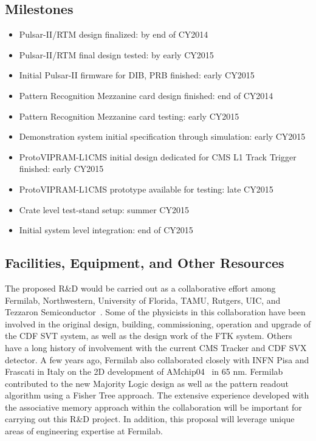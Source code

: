 \subsection{Milestones}
\begin{itemize}

\item Pulsar-II/RTM design finalized: by end of CY2014
\item Pulsar-II/RTM final design tested: by early CY2015
\item Initial Pulsar-II firmware for DIB, PRB finished: early CY2015
\item Pattern Recognition Mezzanine card design finished:  end of CY2014
\item Pattern Recognition Mezzanine card testing:  early CY2015
\item Demonstration system initial specification through simulation:  early CY2015
\item ProtoVIPRAM-L1CMS initial design dedicated for CMS L1 Track Trigger finished: early CY2015
\item ProtoVIPRAM-L1CMS prototype available for testing:  late CY2015
\item Crate level test-stand setup: summer CY2015
\item Initial system level integration: end of CY2015

\end{itemize}

\subsection{Facilities, Equipment, and Other Resources}

The proposed R\&D would be carried out as a collaborative effort among Fermilab, Northwestern, University of Florida, TAMU, Rutgers, UIC, and Tezzaron Semiconductor~\cite{bib:Tezzaron}. Some of the physicists in this collaboration have been involved in the original design, building, commissioning, operation and upgrade of the CDF SVT system, as well as the design work of the FTK system. Others have a long history of involvement with the current CMS Tracker and CDF SVX detector. A few years ago, Fermilab also collaborated closely with INFN Pisa and Frascati in Italy on the 2D development of AMchip04~\cite{bib:AMchip04} in 65 nm.  Fermilab contributed to the new Majority Logic design as well as the pattern readout algorithm using a Fisher Tree approach. The extensive experience developed with the associative memory approach within the collaboration will be important for carrying out this R\&D project.  In addition, this proposal will leverage unique areas of engineering expertise at Fermilab. 

